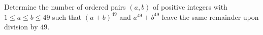 Determine the number of ordered pairs $(a,b)$ of positive integers with $1\leq a\leq b\leq49$ such that $(a+b)^{49}$ and $a^{49}+b^{49}$ leave the same remainder upon division by $49$.